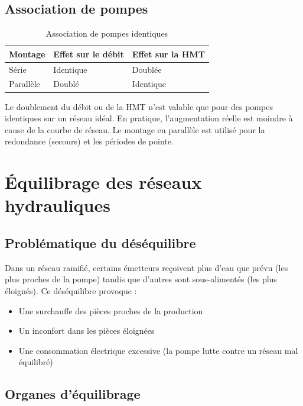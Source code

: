 \subsection{Association de pompes}

\begin{table}[H]
  \centering
  \caption{Association de pompes identiques}
  \begin{tabular}{lll}
    \toprule
    Montage & Effet sur le débit & Effet sur la HMT \\
    \midrule
    Série & Identique & Doublée \\
    Parallèle & Doublé & Identique \\
    \bottomrule
  \end{tabular}
\end{table}

\begin{attention}
Le doublement du débit ou de la HMT n'est valable que pour des pompes identiques sur un réseau idéal. En pratique, l'augmentation réelle est moindre à cause de la courbe de réseau. Le montage en parallèle est utilisé pour la redondance (secours) et les périodes de pointe.
\end{attention}

\section{Équilibrage des réseaux hydrauliques}

\subsection{Problématique du déséquilibre}

Dans un réseau ramifié, certains émetteurs reçoivent plus d'eau que prévu (les plus proches de la pompe) tandis que d'autres sont sous-alimentés (les plus éloignés). Ce déséquilibre provoque :
\begin{itemize}
  \item Une surchauffe des pièces proches de la production
  \item Un inconfort dans les pièces éloignées
  \item Une consommation électrique excessive (la pompe lutte contre un réseau mal équilibré)
\end{itemize}

\subsection{Organes d'équilibrage}

